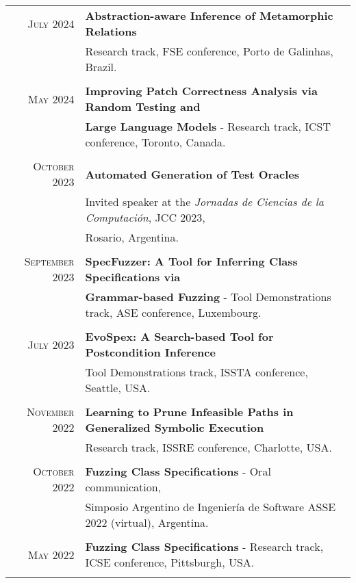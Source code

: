 \documentclass[a4paper,10pt]{article} %
\begin{document}
\begin{longtable}{rl}

\textsc{July} 2024  & \textbf{Abstraction-aware Inference of Metamorphic Relations} \\ 
& Research track, FSE conference, Porto de Galinhas, Brazil. \\ & \\

\textsc{May} 2024  & \textbf{Improving Patch Correctness Analysis via Random Testing and} \\ 
& \textbf{Large Language Models} - Research track, ICST conference, Toronto, Canada. \\ & \\

\textsc{October} 2023  & \textbf{Automated Generation of Test Oracles} \\ 
& Invited speaker at the \textit{Jornadas de Ciencias de la Computación}, JCC 2023, \\ 
& Rosario, Argentina. \\ & \\

\textsc{September} 2023  & \textbf{SpecFuzzer: A Tool for Inferring Class Specifications via} \\ 
& \textbf{Grammar-based Fuzzing} - Tool Demonstrations track, ASE conference, Luxembourg. \\ & \\

\textsc{July} 2023 & \textbf{EvoSpex: A Search-based Tool for Postcondition Inference} \\ 
& Tool Demonstrations track, ISSTA conference, Seattle, USA. \\ & \\

\textsc{November} 2022 & \textbf{Learning to Prune Infeasible Paths in Generalized Symbolic Execution} \\
& Research track, ISSRE conference, Charlotte, USA. \\ & \\

\textsc{October} 2022 & \textbf{Fuzzing Class Specifications} - Oral communication, \\ 
& Simposio Argentino de Ingeniería de Software ASSE 2022 (virtual), Argentina. \\ & \\

\textsc{May} 2022 & \textbf{Fuzzing Class Specifications} - Research track, ICSE conference, Pittsburgh, USA. \\ & \\


\end{longtable}
\end{document}
